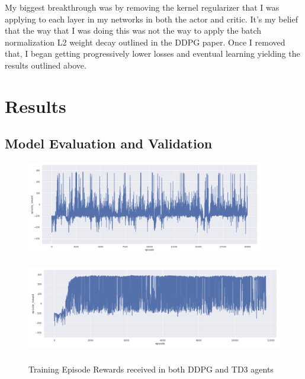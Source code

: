 \documentclass{article}
\begin{document}
My biggest breakthrough was by removing the kernel regularizer that I was applying to each layer in my networks in both the actor and critic. It's my belief that the way that I was doing this was not the way to apply the batch normalization L2 weight decay outlined in the DDPG paper. Once I removed that, I began getting progressively lower losses and eventual learning yielding the results outlined above. 


\section{Results}
\label{sec:results}

\subsection{Model Evaluation and Validation}

\begin{figure}[h]
\caption{Training Episode Rewards received in both DDPG and TD3 agents}
\centering

\begin{minipage}[t]{.5\linewidth}
\centering
\includegraphics[width=\linewidth, height=4cm]{images/episode_reward_ddpg.png}
\label{fig:a}
\end{minipage}%
\begin{minipage}[t]{.5\linewidth}
\centering
\includegraphics[width=\linewidth, height=4cm]{images/episode_reward_td3.png}
\label{fig:b}
\end{minipage}
\label{fig:episode_rewards_results}
\end{figure}
\end{document}
